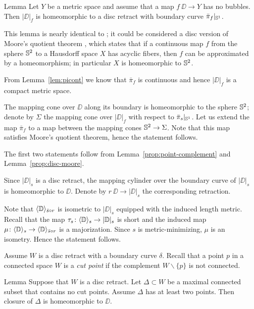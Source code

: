 \begin{thm}{Lemma}\label{prop:disc-moore}
Let $Y$ be a metric space and assume that a map $f\:\DD\to Y$ has no bubbles.
Then $|\DD|_f$ is homeomorphic to a disc retract with boundary curve $\bar\pi_f|_{\mathbb{S}^1}$.
\end{thm}

This lemma is nearly identical to \cite[Corollary 7.12]{LW3}; it could be considered a disc version of Moore's quotient theorem \cite{moore}, \cite{daverman}
which states that if a continuous map $f$ from the sphere $\mathbb{S}^2$ to a Hausdorff space $X$
has acyclic fibers, then $f$ can be approximated by a homeomorphism;
in particular $X$ is homeomorphic to $\mathbb{S}^2$.

From Lemma~\ref{lem:picont} we know that $\bar\pi_f$ is continuous and hence $|\DD|_f$
is a compact metric space. 


The mapping cone over $\DD$ along its boundary is homeomorphic to the sphere $\mathbb{S}^2$;
denote by $\Sigma$ the mapping cone over $|\DD|_f$ with respect to $\bar\pi_s|_{\mathbb{S}^1}$.
Let us extend the map $\bar\pi_f$ to a map between the mapping cones $\mathbb{S}^2\to\Sigma$.
Note that this map satisfies Moore's quotient theorem, hence the statement follows.
\qeds

The first two statements follow from Lemma~\ref{prop:point-complement} and Lemma~\ref{prop:disc-moore}.

Since $|\DD|_s$ is a disc retract, the mapping cylinder over the boundary curve of $|\DD|_s$ is homeomorphic to $\DD$.
Denote by $r \:\DD\to |\DD|_s$ the corresponding retraction.

Note that $\langle\mathbb{D}\rangle_{\bar s\circ r}$ is isometric to $|\DD|_s$ equipped with the induced length metric.
Recall that the map $\tau_s\colon\langle\mathbb{D}\rangle_s\to|\mathbb{D}|_s$ is short and the induced map $\mu\:\<\DD\>_s\zz\to\<\DD\>_{\bar s\circ r}$ is a majorization.
Since $s$ is metric-minimizing, $\mu$ is an isometry.
Hence the statement follows.
\qeds

Assume $W$ is a disc retract with a boundary curve $\delta$.
Recall that a point $p$ in a connected space $W$ is a \emph{cut point} if the complement $W\backslash\{p\}$ is not connected.

\begin{thm}{Lemma}\label{lem:discs}
Suppose that $W$ is a disc retract.
Let $\Delta\subset W$ be a maximal connected subset that contains no cut points.
Assume $\Delta$ has at least two points.
Then closure of $\Delta$ is homeomorphic to $\DD$.
\end{thm}

